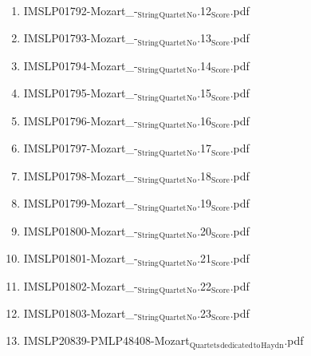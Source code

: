 \documentclass[11pt]{article}
\begin{document}
\begin{enumerate}
\begin{enumerate}
\item IMSLP01792-Mozart\_-$_{\text{String}}$$_{\text{Quartet}}$$_{\text{No}}$.12$_{\text{Score}}$.pdf
\label{sec-1-1-1-1-44-49-9-11}

\item IMSLP01793-Mozart\_-$_{\text{String}}$$_{\text{Quartet}}$$_{\text{No}}$.13$_{\text{Score}}$.pdf
\label{sec-1-1-1-1-44-49-9-12}

\item IMSLP01794-Mozart\_-$_{\text{String}}$$_{\text{Quartet}}$$_{\text{No}}$.14$_{\text{Score}}$.pdf
\label{sec-1-1-1-1-44-49-9-13}

\item IMSLP01795-Mozart\_-$_{\text{String}}$$_{\text{Quartet}}$$_{\text{No}}$.15$_{\text{Score}}$.pdf
\label{sec-1-1-1-1-44-49-9-14}

\item IMSLP01796-Mozart\_-$_{\text{String}}$$_{\text{Quartet}}$$_{\text{No}}$.16$_{\text{Score}}$.pdf
\label{sec-1-1-1-1-44-49-9-15}

\item IMSLP01797-Mozart\_-$_{\text{String}}$$_{\text{Quartet}}$$_{\text{No}}$.17$_{\text{Score}}$.pdf
\label{sec-1-1-1-1-44-49-9-16}

\item IMSLP01798-Mozart\_-$_{\text{String}}$$_{\text{Quartet}}$$_{\text{No}}$.18$_{\text{Score}}$.pdf
\label{sec-1-1-1-1-44-49-9-17}

\item IMSLP01799-Mozart\_-$_{\text{String}}$$_{\text{Quartet}}$$_{\text{No}}$.19$_{\text{Score}}$.pdf
\label{sec-1-1-1-1-44-49-9-18}

\item IMSLP01800-Mozart\_-$_{\text{String}}$$_{\text{Quartet}}$$_{\text{No}}$.20$_{\text{Score}}$.pdf
\label{sec-1-1-1-1-44-49-9-19}

\item IMSLP01801-Mozart\_-$_{\text{String}}$$_{\text{Quartet}}$$_{\text{No}}$.21$_{\text{Score}}$.pdf
\label{sec-1-1-1-1-44-49-9-20}

\item IMSLP01802-Mozart\_-$_{\text{String}}$$_{\text{Quartet}}$$_{\text{No}}$.22$_{\text{Score}}$.pdf
\label{sec-1-1-1-1-44-49-9-21}

\item IMSLP01803-Mozart\_-$_{\text{String}}$$_{\text{Quartet}}$$_{\text{No}}$.23$_{\text{Score}}$.pdf
\label{sec-1-1-1-1-44-49-9-22}

\item IMSLP20839-PMLP48408-Mozart$_{\text{Quartets}}$$_{\text{dedicated}}$$_{\text{to}}$$_{\text{Haydn}}$.pdf
\label{sec-1-1-1-1-44-49-9-23}


\end{enumerate}
\end{enumerate}
\end{document}
